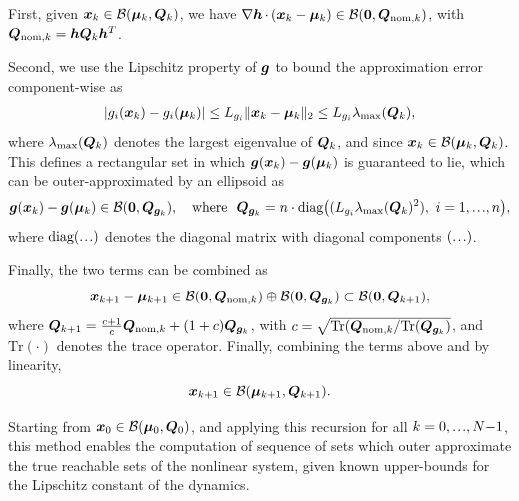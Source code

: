 \documentclass{article}
\begin{document}
First, given $\bm{x}_k\in\mathcal{B}(\boldsymbol\mu_k,\bm{Q}_k)$, we have $\nabla \bm{h} \,{\cdot}\, (\bm{x}_k-\boldsymbol\mu_k)\in\mathcal{B}(\mathbf{0},\bm{Q}_{\textrm{nom},k})$, with $\bm{Q}_{\textrm{nom},k}=\bm{h}\bm{Q}_k\bm{h}^T$. 

Second, we use the Lipschitz property of $\bm{g}$ to bound the approximation error component-wise as
\begin{align}
|g_i(\bm{x}_k)-g_i(\boldsymbol\mu_k)|\leq L_{g_i} \|\bm{x}_k-\boldsymbol\mu_k\|_2\leq L_{g_i} \lambda_{\max}(\bm{Q}_k),
\end{align}
where $\lambda_{\max}(\bm{Q}_k)$ denotes the largest eigenvalue of $\bm{Q}_k$, and since $\bm{x}_k\in\mathcal{B}(\boldsymbol\mu_k,\bm{Q}_k)$. This defines a rectangular set in which $\bm{g}(\bm{x}_k)-\bm{g}(\boldsymbol\mu_k)$ is guaranteed to lie, which can be outer-approximated by an ellipsoid as
\begin{equation}
\g(\x_k)-\g(\bmu_k)\in\B(\mathbf{0},\bQ_{\g_k}), \quad \text{where} \ \ \bQ_{\g_k}=n\cdot\textrm{diag}\big((L_{g_i}\lambda_{\max}(\bQ_k)^2), \ i=1,\mydots,n \big),
\label{eq:Qg_diag}
\end{equation}
where $\textrm{diag}(\mydots)$ denotes the diagonal matrix with diagonal components $(\mydots)$. %

Finally, the two terms can be combined as 
\begin{equation}
\bm{x}_{k+1}-\boldsymbol\mu_{k+1} \in
\mathcal{B}(\mathbf{0},\bm{Q}_{\textrm{nom},k})
\oplus
\mathcal{B}(\mathbf{0},\bm{Q}_{\bm{g}_k})
\subset
\mathcal{B}(\mathbf{0},\bm{Q}_{k+1}),
\end{equation}
where $\bm{Q}_{k+1}=\frac{c+1}{c}\bm{Q}_{\textrm{nom},k} + (1+c)\bm{Q}_{\bm{g}_k}$, with $c=\sqrt{\textrm{Tr}(\bm{Q}_{\textrm{nom},k}/\textrm{Tr}(\bm{Q}_{\bm{g}_k})}$, and $\textrm{Tr}(\cdot)$ denotes the trace operator. Finally, combining the terms above and by linearity,
\begin{equation}
\bm{x}_{k+1} \in \mathcal{B}(\boldsymbol\mu_{k+1},\bm{Q}_{k+1}).
\end{equation}


Starting from $\bm{x}_0\in\mathcal{B}(\boldsymbol\mu_0,\bm{Q}_0)$, and applying this recursion for all $k=0,\mydots, N{-}1$, this method enables the computation of sequence of sets which outer approximate the true reachable sets of the nonlinear system, given known upper-bounds for the Lipschitz constant of the dynamics. 



\newpage
\end{document}
